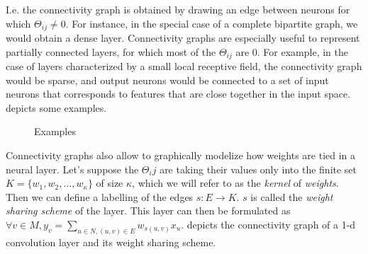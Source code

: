 I.e. the connectivity graph is obtained by drawing an edge between neurons for which $\Theta_{ij} \neq 0$.
For instance, in the special case of a complete bipartite graph, we would obtain a dense layer. 
Connectivity graphs are especially useful to represent partially connected layers, for which most of the $\Theta_{ij}$ are $0$. 
For example, in the case of layers characterized by a small local receptive field, the connectivity graph would be sparse, and output neurons would be connected to a set of input neurons that corresponds to features that are close together in the input space.  depicts some examples.

\begin{figure}[h]
  \begin{center}
  \end{center}
  \caption{Examples}
  \label{con_ex}
\end{figure}



Connectivity graphs also allow to graphically modelize how weights are tied in a neural layer. Let's suppose the $\Theta_ij$ are taking their values only into the finite set $K = \{w_1, w_2, \ldots, w_\kappa\}$ of size $\kappa$, which we will refer to as the \emph{kernel} of \emph{weights}. Then we can define a labelling of the edges $s: E \rightarrow K$. $s$ is called the \emph{weight sharing scheme} of the layer. This layer can then be formulated as $\displaystyle \forall v \in M, y_v = \sum_{u \in N, (u,v) \in E} w_{s(u,v)} x_u$.  depicts the connectivity graph of a 1-d convolution layer and its weight sharing scheme.

